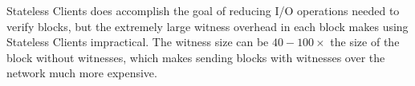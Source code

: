 \documentclass[12pt]{article}
\newcommand{\System}{Stateless Clients\xspace}
\begin{document}
\System does accomplish the goal of reducing I/O operations needed to verify blocks, but the extremely large witness overhead in each block makes using \System impractical. The witness size can be $40-100\times$ the size of the block without witnesses, which makes sending blocks with witnesses over the network much more expensive.




\end{document}
